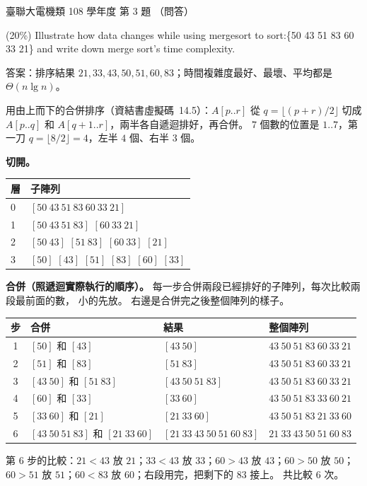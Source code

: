 \begin{pastexam}[label={px:ust-108-ee-ds-03}]{臺聯大電機類 108 學年度 第 3 題}
（問答）

(20\%) Illustrate how data changes while using mergesort to sort:\{50 43 51 83 60 33 21\} and write
down merge sort's time complexity.
\end{pastexam}

\begin{pastsoln}
答案：排序結果 $21, 33, 43, 50, 51, 60, 83$；時間複雜度最好、最壞、平均都是 $\Theta(n \lg n)$。

用由上而下的合併排序（資結書虛擬碼~14.5）：$A[p..r]$ 從 $q = \lfloor (p + r)/2 \rfloor$ 切成
$A[p..q]$ 和 $A[q+1..r]$，兩半各自遞迴排好，再合併。 $7$ 個數的位置是 $1..7$，第一刀
$q = \lfloor 8/2 \rfloor = 4$，左半 $4$ 個、右半 $3$ 個。

\textbf{切開。}
\begin{center}
\begin{tabular}{ll}
\toprule
層 & 子陣列 \\
\midrule
0 & $[50\ 43\ 51\ 83\ 60\ 33\ 21]$ \\
1 & $[50\ 43\ 51\ 83]$ \quad $[60\ 33\ 21]$ \\
2 & $[50\ 43]$ \quad $[51\ 83]$ \quad $[60\ 33]$ \quad $[21]$ \\
3 & $[50]$ \quad $[43]$ \quad $[51]$ \quad $[83]$ \quad $[60]$ \quad $[33]$ \\
\bottomrule
\end{tabular}
\end{center}

\textbf{合併（照遞迴實際執行的順序）。} 每一步合併兩段已經排好的子陣列，每次比較兩段最前面的數，
小的先放。 右邊是合併完之後整個陣列的樣子。
\begin{center}
\begin{tabular}{clll}
\toprule
步 & 合併 & 結果 & 整個陣列 \\
\midrule
1 & $[50]$ 和 $[43]$ & $[43\ 50]$ & $43\ 50\ 51\ 83\ 60\ 33\ 21$ \\
2 & $[51]$ 和 $[83]$ & $[51\ 83]$ & $43\ 50\ 51\ 83\ 60\ 33\ 21$ \\
3 & $[43\ 50]$ 和 $[51\ 83]$ & $[43\ 50\ 51\ 83]$ & $43\ 50\ 51\ 83\ 60\ 33\ 21$ \\
4 & $[60]$ 和 $[33]$ & $[33\ 60]$ & $43\ 50\ 51\ 83\ 33\ 60\ 21$ \\
5 & $[33\ 60]$ 和 $[21]$ & $[21\ 33\ 60]$ & $43\ 50\ 51\ 83\ 21\ 33\ 60$ \\
6 & $[43\ 50\ 51\ 83]$ 和 $[21\ 33\ 60]$ & $[21\ 33\ 43\ 50\ 51\ 60\ 83]$ & $21\ 33\ 43\ 50\ 51\ 60\ 83$ \\
\bottomrule
\end{tabular}
\end{center}
第 6 步的比較：$21 < 43$ 放 $21$；$33 < 43$ 放 $33$；$60 > 43$ 放 $43$；$60 > 50$ 放 $50$；
$60 > 51$ 放 $51$；$60 < 83$ 放 $60$；右段用完，把剩下的 $83$ 接上。 共比較 $6$ 次。


\end{pastsoln}
